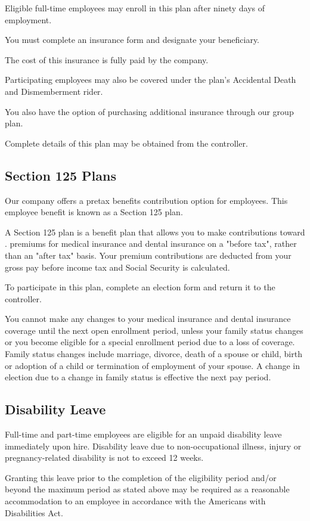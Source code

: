 Eligible full-time employees may enroll in this plan after ninety days of employment.

You must complete an insurance form and designate your beneficiary.

The cost of this insurance is fully paid by the company.

Participating employees may also be covered under the plan's Accidental Death and Dismemberment rider.

You also have the option of purchasing additional insurance through our group plan.

Complete details of this plan may be obtained from the controller.

\subsection{Section 125 Plans}

Our company offers a pretax benefits contribution option for employees. This employee benefit is known as a Section 125 plan.

A Section 125 plan is a benefit plan that allows you to make contributions toward . premiums for medical insurance and dental insurance on a "before tax", rather than an "after tax" basis. Your premium contributions are deducted from your gross pay before income tax and Social Security is calculated.

To participate in this plan, complete an election form and return it to the controller.

You cannot make any changes to your medical insurance and dental insurance coverage until the next open enrollment period, unless your family status changes or you become eligible for a special enrollment period due to a loss of coverage. Family status changes include marriage, divorce, death of a spouse or child, birth or adoption of a child or termination of employment of your spouse. A change in election due to a change in family status is effective the next pay period.

\subsection{Disability Leave}

Full-time and part-time employees are eligible for an unpaid disability leave immediately upon hire. Disability leave due to non-occupational illness, injury or pregnancy-related disability is not to exceed 12 weeks.

Granting this leave prior to the completion of the eligibility period and/or beyond the maximum period as stated above may be required as a reasonable accommodation to an employee in accordance with the Americans with Disabilities Act.

